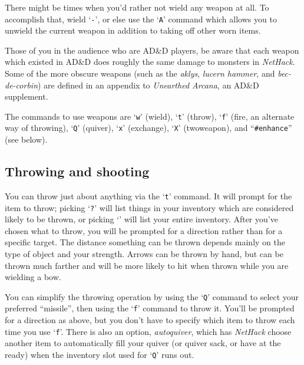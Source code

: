There might be times when you'd rather not wield any weapon at all.
To accomplish that, wield `{\tt -}', or else use the `{\tt A}' command which
allows you to unwield the current weapon in addition to taking off
other worn items.

Those of you in the audience who are AD\&D players, be aware that each
weapon which existed in AD\&D does roughly the same damage to monsters in
{\it NetHack}.  Some of the more obscure weapons (such as the %
{\it aklys}, {\it lucern hammer}, and {\it bec-de-corbin\/}) are defined
in an appendix to {\it Unearthed Arcana}, an AD\&D supplement.

The commands to use weapons are `{\tt w}' (wield), `{\tt t}' (throw),
`{\tt f}' (fire, an alternate way of throwing), `{\tt Q}' (quiver),
`{\tt x}' (exchange), `{\tt X}' (twoweapon), and ``{\tt \#enhance}''
(see below).

\subsection*{Throwing and shooting}

You can throw just about anything via the `{\tt t}' command.  It will prompt
for the item to throw; picking `{\tt ?}' will list things in your inventory
which are considered likely to be thrown, or picking `{\tt *}' will list
your entire inventory.  After you've chosen what to throw, you will
be prompted for a direction rather than for a specific target.  The
distance something can be thrown depends mainly on the type of object
and your strength.  Arrows can be thrown by hand, but can be thrown
much farther and will be more likely to hit when thrown while you are
wielding a bow.

You can simplify the throwing operation by using the `{\tt Q}' command to
select your preferred ``missile'', then using the `{\tt f}' command to
throw it.  You'll be prompted for a direction as above, but you don't
have to specify which item to throw each time you use `{\tt f}'.  There is
also an option,
{\it autoquiver},
which has {\it NetHack\/} choose another item to automatically fill your
quiver (or quiver sack, or have at the ready) when the inventory slot used
for `{\tt Q}' runs out.

